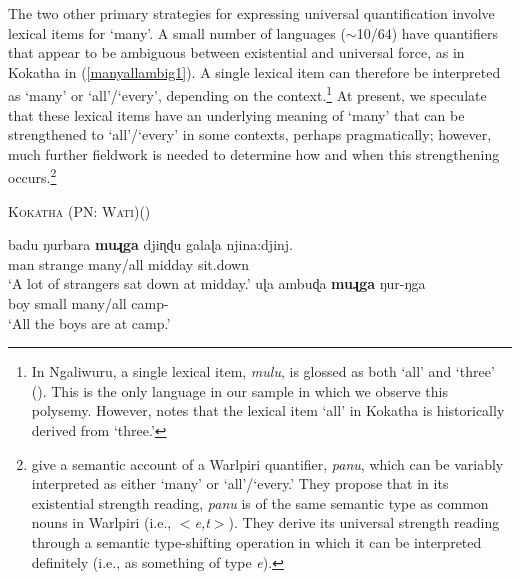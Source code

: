 \documentclass[12pt,egregdoesnotlikesansseriftitles]{scrartcl}
\begin{document}
The two other primary strategies for expressing universal quantification  involve lexical items for `many'. A small number of languages ($\sim$10/64) have quantifiers that appear to be ambiguous between existential and universal force, as in Kokatha \textit{} in  (\ref{manyallambig1}). %
A single lexical item can therefore be interpreted as `many' or `all'/`every', depending on the context.\footnote{In Ngaliwuru, a single lexical item, \textit{mulu}, is glossed as both `all' and `three' (\citealt[77]{boltetal71}). This is the only language in our sample in which we observe this polysemy. However, \cite{platt72} notes that the lexical item \textit{{}} `all' in Kokatha is historically derived from `three.'} At present, we speculate that these lexical items have an underlying meaning of `many' that can be strengthened to `all'/`every' in some contexts, perhaps pragmatically; however, much further fieldwork is needed to determine how and when this strengthening occurs.\footnote{\cite{bittnerhale95} give a semantic account of a Warlpiri quantifier, \textit{panu}, which can be variably interpreted as either `many' or `all'/`every.' They propose that in its existential strength reading, \textit{panu} is of the same semantic type as common nouns in Warlpiri (i.e., $<$\textit{e,t}$>$). They derive its universal strength reading through a semantic type-shifting operation in which it can be interpreted definitely (i.e., as something of type \textit{e}).} %

\begin{exe}
  \ex\label{manyallambig1}\textsc{Kokatha (PN: Wati)}\hfill (\citealt[56--65]{platt72})
  \begin{xlist}
    \ex \gll badu ŋurbara \textbf{muɻga} {djiɳɖu galaɭa} njina:djinj.\\
    man  strange  many/all  midday         sit.down\\
    \glt `A lot of strangers sat down at midday.'
    \ex \gll uɭa ambuɖa \textbf{muɻga} ŋur-ŋga\\
    boy   small    many/all      camp-\Loc\\
    \glt `All the boys are at camp.'%
  \end{xlist}
 \end{exe}
 
\end{document}
